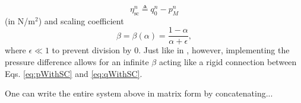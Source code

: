 \begin{equation}
    \eta_\text{sc}^n \triangleq q_0^n - p_M^n
\end{equation}
(in N/m$^2$) and scaling coefficient
\begin{equation}\label{eq:betaDef}
    \beta = \beta(\alpha) = \frac{1-\alpha}{\alpha+\epsilon},
\end{equation}
where $\epsilon\ll 1$ to prevent division by 0. Just like in \cite{Willemsen2021}, however, implementing the pressure difference allows for an infinite $\beta$ acting like a rigid connection between Eqs. \eqref{eq:pWithSC} and \eqref{eq:qWithSC}.


One can write the entire system above in matrix form by concatenating...
